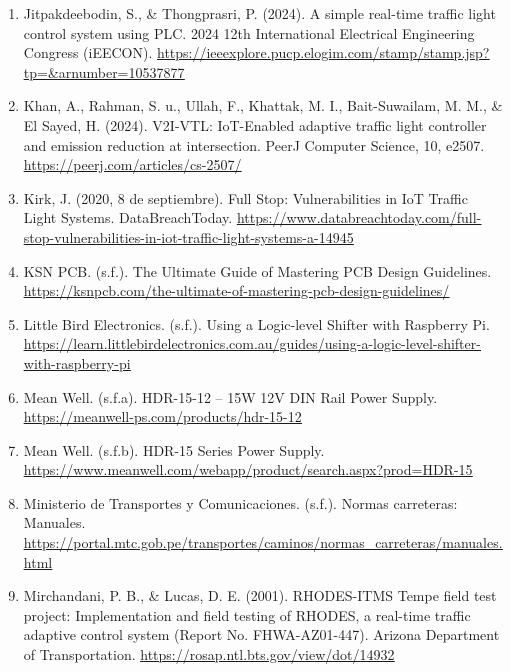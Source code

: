 \begin{enumerate}
\item
  Jitpakdeebodin, S., \& Thongprasri, P. (2024). A simple real-time traffic light control system using PLC. 2024 12th International Electrical Engineering Congress (iEECON). \href{https://ieeexplore.pucp.elogim.com/stamp/stamp.jsp?tp=&arnumber=10537877}{\ul{https://ieeexplore.pucp.elogim.com/stamp/stamp.jsp?tp=\&arnumber=10537877}}
\item
  Khan, A., Rahman, S. u., Ullah, F., Khattak, M. I., Bait-Suwailam, M. M., \& El Sayed, H. (2024). V2I-VTL: IoT-Enabled adaptive traffic light controller and emission reduction at intersection. PeerJ Computer Science, 10, e2507. \href{https://peerj.com/articles/cs-2507/}{\ul{https://peerj.com/articles/cs-2507/}}
\item
  Kirk, J. (2020, 8 de septiembre). Full Stop: Vulnerabilities in IoT Traffic Light Systems. DataBreachToday. \href{https://www.databreachtoday.com/full-stop-vulnerabilities-in-iot-traffic-light-systems-a-14945}{\ul{https://www.databreachtoday.com/full-stop-vulnerabilities-in-iot-traffic-light-systems-a-14945}}
\item
  KSN PCB. (s.f.). The Ultimate Guide of Mastering PCB Design Guidelines. \href{https://ksnpcb.com/the-ultimate-of-mastering-pcb-design-guidelines/}{\ul{https://ksnpcb.com/the-ultimate-of-mastering-pcb-design-guidelines/}}
\item
  Little Bird Electronics. (s.f.). Using a Logic-level Shifter with Raspberry Pi. \href{https://learn.littlebirdelectronics.com.au/guides/using-a-logic-level-shifter-with-raspberry-pi}{\ul{https://learn.littlebirdelectronics.com.au/guides/using-a-logic-level-shifter-with-raspberry-pi}}
\item
  Mean Well. (s.f.a). HDR-15-12 -- 15W 12V DIN Rail Power Supply. \href{https://meanwell-ps.com/products/hdr-15-12}{\ul{https://meanwell-ps.com/products/hdr-15-12}}
\item
  Mean Well. (s.f.b). HDR-15 Series Power Supply. \href{https://www.meanwell.com/webapp/product/search.aspx?prod=HDR-15}{\ul{https://www.meanwell.com/webapp/product/search.aspx?prod=HDR-15}}
\item
  Ministerio de Transportes y Comunicaciones. (s.f.). Normas carreteras: Manuales. \href{https://portal.mtc.gob.pe/transportes/caminos/normas_carreteras/manuales.html}{\ul{https://portal.mtc.gob.pe/transportes/caminos/normas\_carreteras/manuales.html}}
\item
  Mirchandani, P. B., \& Lucas, D. E. (2001). RHODES-ITMS Tempe field test project: Implementation and field testing of RHODES, a real-time traffic adaptive control system (Report No. FHWA-AZ01-447). Arizona Department of Transportation. \href{https://rosap.ntl.bts.gov/view/dot/14932}{\ul{https://rosap.ntl.bts.gov/view/dot/14932}}

\end{enumerate}
